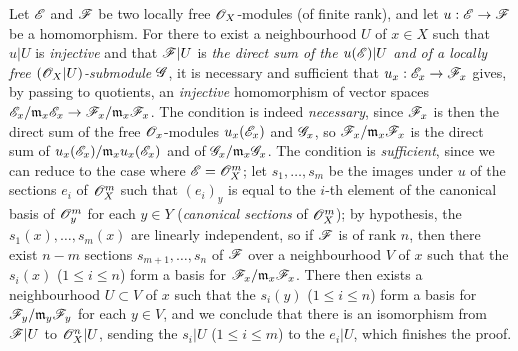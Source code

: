 \begin{env}[5.5.5]
\label{0.5.5.5}
Let $\mathscr{E}$ and $\mathscr{F}$ be two locally free $\mathscr{O}_X$-modules (of finite rank), and let $u:\sh{E}\to\sh{F}$ be a homomorphism.
For there to exist a neighbourhood $U$ of $x\in X$ such that $u|U$ is \emph{injective} and that $\mathscr{F}|U$ is \emph{the direct sum of the $u(\mathscr{E})|U$ and of a locally free $(\mathscr{O}_X|U)$-submodule $\mathscr{G}$}, it is necessary and sufficient that $u_x:\sh{E}_x\to\sh{F}_x$ gives, by passing to quotients, an \emph{injective} homomorphism of vector spaces $\sh{E}_x/\mathfrak{m}_x\sh{E}_x\to\sh{F}_x/\mathfrak{m}_x\sh{F}_x$.
The condition is indeed \emph{necessary}, since $\mathscr{F}_x$ is then the direct sum of the free $\mathscr{O}_x$-modules $u_x(\mathscr{E}_x)$ and $\mathscr{G}_x$, so $\mathscr{F}_x/\mathfrak{m}_x\mathscr{F}_x$ is the direct sum of $u_x(\mathscr{E}_x)/\mathfrak{m}_x u_x(\mathscr{E}_x)$ and of $\mathscr{G}_x/\mathfrak{m}_x\mathscr{G}_x$.
The condition is \emph{sufficient}, since we can reduce to the case where $\mathscr{E}=\mathscr{O}_X^m$;
let $s_1,\dots,s_m$ be the images under $u$ of the sections $e_i$ of $\mathscr{O}_X^m$ such that $(e_i)_y$ is equal to the $i$-th element of the canonical basis of $\mathscr{O}_y^m$ for each $y\in Y$ (\emph{canonical sections} of $\mathscr{O}_X^m$);
by hypothesis, the $s_1(x),\dots,s_m(x)$ are linearly independent, so if $\mathscr{F}$ is of rank $n$, then there exist $n-m$ sections $s_{m+1},\dots,s_n$ of $\mathscr{F}$ over a neighbourhood $V$ of $x$ such that the $s_i(x)$ ($1\leq i\leq n$) form a basis for $\mathscr{F}_x/\mathfrak{m}_x\mathscr{F}_x$.
There then exists  a neighbourhood $U\subset V$ of $x$ such that the $s_i(y)$ ($1\leq i\leq n$) form a basis for $\mathscr{F}_y/\mathfrak{m}_y\mathscr{F}_y$ for each $y\in V$, and we conclude  that there is an isomorphism from $\mathscr{F}|U$ to $\mathscr{O}_X^n|U$, sending the $s_i|U$ ($1\leq i\leq m$) to the $e_i|U$, which finishes the proof.
\end{env}

